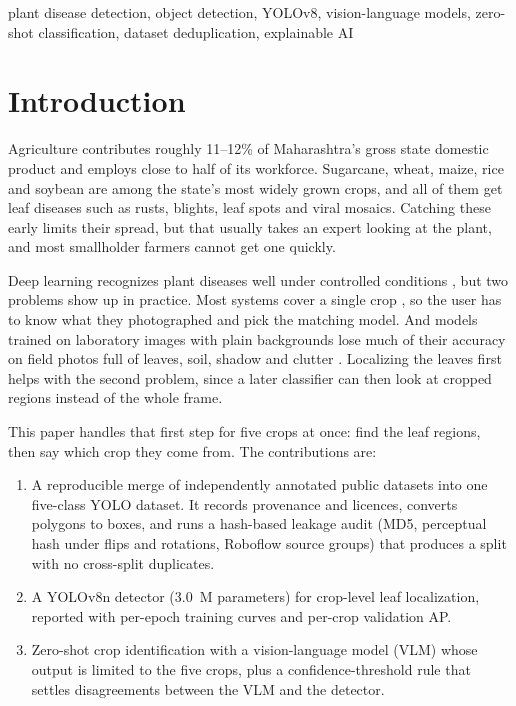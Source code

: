 \documentclass[conference]{IEEEtran}
\begin{document}
\begin{IEEEkeywords}
plant disease detection, object detection, YOLOv8, vision-language models, zero-shot classification, dataset deduplication, explainable AI
\end{IEEEkeywords}

\section{Introduction}

Agriculture contributes roughly 11--12\% of Maharashtra's gross state domestic product and employs close to half of its workforce. Sugarcane, wheat, maize, rice and soybean are among the state's most widely grown crops, and all of them get leaf diseases such as rusts, blights, leaf spots and viral mosaics. Catching these early limits their spread, but that usually takes an expert looking at the plant, and most smallholder farmers cannot get one quickly.

Deep learning recognizes plant diseases well under controlled conditions \cite{mohanty2016, sujatha2025}, but two problems show up in practice. Most systems cover a single crop \cite{phadikar2008, sethupathy2016, khanal2024}, so the user has to know what they photographed and pick the matching model. And models trained on laboratory images with plain backgrounds lose much of their accuracy on field photos full of leaves, soil, shadow and clutter \cite{mohanty2016, singh2020plantdoc}. Localizing the leaves first helps with the second problem, since a later classifier can then look at cropped regions instead of the whole frame.

This paper handles that first step for five crops at once: find the leaf regions, then say which crop they come from. The contributions are:
\begin{enumerate}
\item A reproducible merge of independently annotated public datasets into one five-class YOLO dataset. It records provenance and licences, converts polygons to boxes, and runs a hash-based leakage audit (MD5, perceptual hash under flips and rotations, Roboflow source groups) that produces a split with no cross-split duplicates.
\item A YOLOv8n detector (3.0~M parameters) for crop-level leaf localization, reported with per-epoch training curves and per-crop validation AP.
\item Zero-shot crop identification with a vision-language model (VLM) whose output is limited to the five crops, plus a confidence-threshold rule that settles disagreements between the VLM and the detector.
\end{enumerate}
\end{document}
